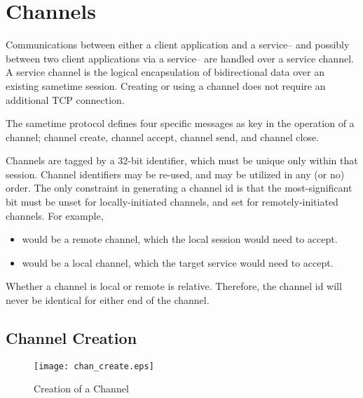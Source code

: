 

\chapter{Channels}

\par{} Communications between either a client application and a
service-- and possibly between two client applications via a service--
are handled over a service channel. A service channel is the logical
encapsulation of bidirectional data over an existing sametime
session. Creating or using a channel does not require an additional
TCP connection.

\par{} The sametime protocol defines four specific messages as key in
the operation of a channel; channel create, channel accept, channel
send, and channel close.

\par{} Channels are tagged by a 32-bit identifier, which must be
unique only within that session. Channel identifiers may be re-used,
and may be utilized in any (or no) order. The only constraint in
generating a channel id is that the most-significant bit must be unset
for locally-initiated channels, and set for remotely-initiated
channels. For example,

\begin{itemize}
\item {} would be a remote channel, which the local
session would need to accept.
\item {} would be a local channel, which the target
service would need to accept.
\end{itemize}

\par{} Whether a channel is local or remote is relative. Therefore,
the channel id will never be identical for either end of the channel.


\section{Channel Creation}

\begin{figure}[!h]
  \begin{center}
    \texttt{[image: chan\_create.eps]}
  \end{center}
  \caption{Creation of a Channel}
  \label{chan_create}
\end{figure}

